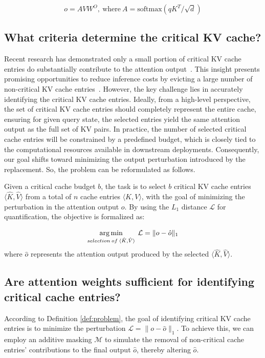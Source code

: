 {
\small
\begin{equation}
	\label{eqn:o}
	o = A V W^O, \: \text{where} \: A = \text{softmax}\left(qK^T/\sqrt{d}\right)
\end{equation}
}
\subsection{What criteria determine the critical KV cache?}
\label{subsec:def}
Recent research has demonstrated only a small portion of critical KV cache entries do substantially contribute to the attention output~\citep{h2o,liu2024scissorhands}.
This insight presents promising opportunities to reduce inference costs by evicting a large number of non-critical KV cache entries~\cite{SnapKV,pyramidkv,ada,ge2024modeltellsdiscardadaptive,adnan2024keyformer,ge2024model}.
However, the key challenge lies in accurately identifying the critical KV cache entries.
Ideally, from a high-level perspective, the set of critical KV cache entries should completely represent the entire cache, ensuring for given query state, the selected entries yield the same attention output as the full set of KV pairs. In practice, the number of selected critical cache entries will be constrained by a predefined budget, which is closely tied to the computational resources available in downstream deployments. Consequently, our goal shifts toward minimizing the output perturbation introduced by the replacement. So, the problem can be reformulated as follows.
\begin{definition}
	\label{def:problem}
Given a critical cache budget $b$, the task is to select $b$ critical KV cache entries  $\langle \hat{K}, \hat{V}\rangle$ from a total of $n$ cache entries $\langle K , V \rangle$, with the goal of minimizing the perturbation in the attention output $o$. By using the $L_1$ distance $\mathcal{L}$ for quantification, the objective is formalized as:

	{\small
		\begin{align}
		\operatorname*{arg\,min}_{selection\: of \:\langle\hat{K}, \hat{V}\rangle} \: \mathcal{L} =  \lVert o - \hat{o} \rVert_1
	\end{align}}
	where $\hat{o}$ represents the attention output produced by the selected $\langle\hat{K}, \hat{V}\rangle$.
\end{definition}


\subsection{Are attention weights sufficient for identifying critical cache entries?}
\label{subsec:how}
According to Definition \ref{def:problem}, the goal of identifying critical KV cache entries is to minimize the perturbation $\mathcal{L} = \lVert o -\hat{o} \rVert_1$.
To achieve this, we can employ an additive masking $ \mathcal{M} $ to simulate the removal of non-critical cache entries' contributions to the final output $\hat{o}$, thereby altering $\hat{o}$.



